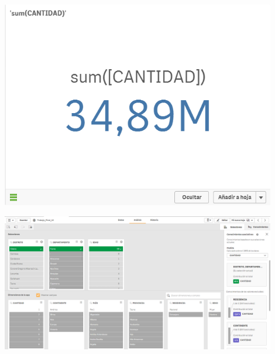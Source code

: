 \begin{center}
	\includegraphics[width=12cm]{./Imagenes/imgDesarrollo_6} 
\end{center}

\begin{center}
	\includegraphics[width=12cm]{./Imagenes/imgDesarrollo_7} 
\end{center}
